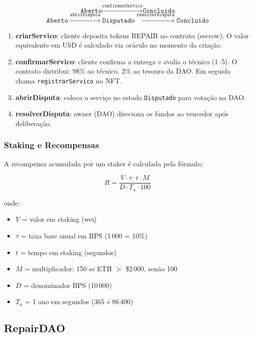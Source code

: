 \documentclass[
    12pt,
    a4paper,
    oneside,
    brazil,
    sumario=tradicional
]{abntex2}
\begin{document}
\[
\texttt{Aberto}
  \xrightarrow{\texttt{confirmarServico}}  \texttt{Concluido}
\]
\[
\texttt{Aberto}
  \xrightarrow{\texttt{abrirDisputa}}      \texttt{Disputado}
  \xrightarrow{\texttt{resolverDisputa}}   \texttt{Concluido}
\]

\begin{enumerate}
    \item \textbf{criarServico}: cliente deposita tokens REPAIR no contrato
    (escrow). O valor equivalente em USD é calculado via oráculo no momento
    da criação.

    \item \textbf{confirmarServico}: cliente confirma a entrega e avalia o
    técnico (1--5). O contrato distribui: 98\% ao técnico, 2\% ao tesouro
    da DAO. Em seguida chama \texttt{registrarServico} no NFT.

    \item \textbf{abrirDisputa}: coloca o serviço no estado
    \texttt{Disputado} para votação na DAO.

    \item \textbf{resolverDisputa}: owner (DAO) direciona os fundos ao
    vencedor após deliberação.
\end{enumerate}

\subsubsection{Staking e Recompensas}

A recompensa acumulada por um staker é calculada pela fórmula:

\begin{equation}
R = \frac{V \cdot \tau \cdot t \cdot M}{D \cdot T_a \cdot 100}
\end{equation}

onde:
\begin{itemize}
    \item $V$ = valor em staking (wei)
    \item $\tau$ = taxa base anual em BPS (1\,000 = 10\%)
    \item $t$ = tempo em staking (segundos)
    \item $M$ = multiplicador: 150 se ETH $>$ \$2\,000, senão 100
    \item $D$ = denominador BPS (10\,000)
    \item $T_a$ = 1 ano em segundos ($365 \times 86\,400$)
\end{itemize}

\subsection{RepairDAO}
\end{document}
